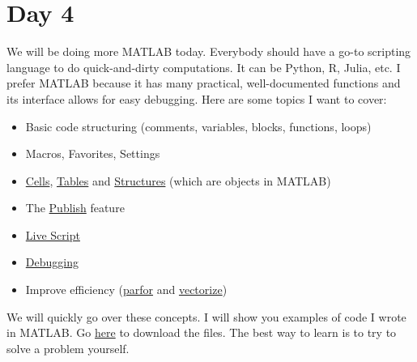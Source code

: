 \documentclass{article}
\begin{document}
\section{Day 4}
We will be doing more MATLAB today. Everybody should have a go-to scripting language to do quick-and-dirty computations. It can be Python, R, Julia, etc. I prefer MATLAB because it has many practical, well-documented functions and its interface allows for easy debugging. Here are some topics I want to cover:
\begin{itemize}
    \item Basic code structuring (comments, variables, blocks, functions, loops)
    \item Macros, Favorites, Settings
    \item \href{https://www.mathworks.com/help/matlab/ref/cell.html}{Cells}, \href{https://www.mathworks.com/help/matlab/ref/table.html}{Tables} and \href{https://www.mathworks.com/help/matlab/ref/struct.html}{Structures} (which are objects in MATLAB)
    \item The \href{https://www.mathworks.com/help/matlab/matlab_prog/publishing-matlab-code.html#responsive_offcanvas}{Publish} feature
    \item \href{https://www.mathworks.com/help/matlab/matlab_prog/what-is-a-live-script-or-function.html}{Live Script}
    \item \href{https://www.mathworks.com/help/matlab/matlab_prog/debugging-process-and-features.html}{Debugging}
    \item Improve efficiency (\href{https://www.mathworks.com/help/distcomp/parfor.html}{parfor} and \href{https://www.mathworks.com/help/matlab/matlab_prog/vectorization.html}{vectorize})
\end{itemize}
We will quickly go over these concepts. I will show you examples of code I wrote in MATLAB. Go \href{https://web.njit.edu/~tt73/599.html}{here} to download the files. The best way to learn is to try to solve a problem yourself.
\end{document}
